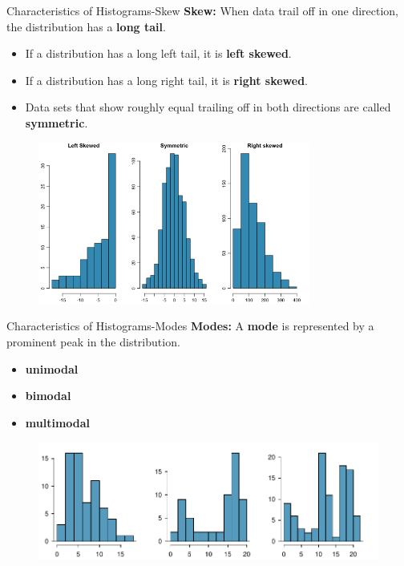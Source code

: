 \documentclass[12pt,a4paper]{beamer}
\begin{document}
\begin{frame}{Characteristics of Histograms-Skew}
	\textbf{Skew:} When data trail off in one direction, the distribution has a \textbf{long tail}.
	\begin{itemize}
		\item If a distribution has a long left tail, it is \textbf{left skewed}. 
		\item If a distribution has a long right tail, it is \textbf{right skewed}. 
		\item Data sets that show roughly equal trailing off in both directions are called \textbf{symmetric}.
	\end{itemize}
	\begin{figure}
	\includegraphics[width=0.8\textwidth]{figures/Skewed}
	\end{figure}
\end{frame}
\begin{frame}{Characteristics of Histograms-Modes}
	\textbf{Modes:} A \textbf{mode} is represented by a prominent peak in the distribution.
	\begin{itemize}
		\item \textbf{unimodal}
		\item \textbf{bimodal}
		\item \textbf{multimodal}
	\end{itemize}
	\begin{figure}[h]
	   \centering
	   \includegraphics[width=\textwidth]{figures/singleBiMultiModalPlots/singleBiMultiModalPlots}
	   \label{singleBiMultiModalPlots}
	\end{figure}
\end{frame}
\end{document}
